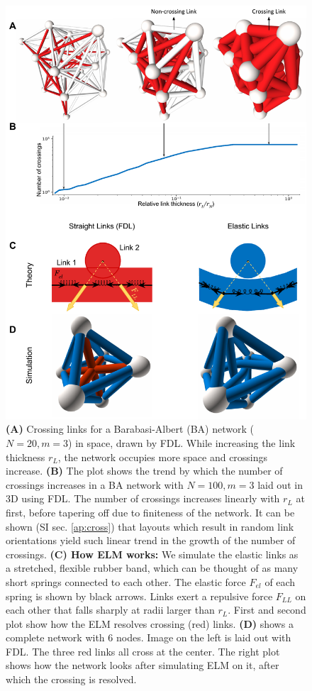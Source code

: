 \documentclass[nofootinbib,preprint,floatfix,titlepage,endfloats]{revtex4} %
\begin{document}
\begin{figure}
    \vspace{4cm}
    \centering
    \includegraphics[width=.8\columnwidth]{fig-09-19/crs-resolve-061717.pdf}
    \caption{\scriptsize
    {\bf (A)}  Crossing links for a Barabasi-Albert (BA) network ($N = 20, m = 3$) in space, drawn by FDL. While increasing the link thickness $r_L$, the network occupies more space and crossings increase. 
    {\bf (B)} The plot shows the trend by which the number of crossings increases in a BA network with $N=100, m =3$ laid out in 3D using FDL.
    The number of crossings increases linearly with $r_L$ at first, before tapering off due to finiteness of the network. It can be shown (SI sec. \ref{ap:cross}) that layouts which result in random link orientations yield such linear trend in the growth of the number of crossings.
    {\bf(C) How ELM works:} We simulate the elastic links as a stretched, flexible rubber band, which can be thought of as many short springs connected to each other. 
    The elastic force $F_{el}$ of each spring is shown by black arrows.
    Links exert a repulsive force $F_{LL}$  on each other that falls sharply at radii larger than $r_L$. 
    First and second plot show how the ELM resolves crossing (red) links. {\bf(D)} shows a complete network with 6 nodes. Image on the left is laid out with FDL. The three red links all cross at the center. The right plot shows how the network looks after simulating ELM on it, after which the crossing is resolved. 
    }     
    \label{fig:crossings0}
\end{figure}
\end{document}
